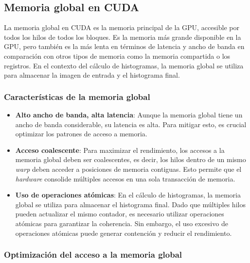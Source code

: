     \subsection{Memoria global en CUDA}

        La memoria global en CUDA es la memoria principal de la GPU, accesible por todos los hilos de todos los bloques. Es la memoria más grande disponible en la GPU, pero también es la más lenta en términos de latencia y ancho de banda en comparación con otros tipos de memoria como la memoria compartida o los registros. En el contexto del cálculo de histogramas, la memoria global se utiliza para almacenar la imagen de entrada y el histograma final.

        \subsubsection{Características de la memoria global}

            \begin{itemize}
               
                \item \textbf{Alto ancho de banda, alta latencia}: Aunque la memoria global tiene un ancho de banda considerable, su latencia es alta. Para mitigar esto, es crucial optimizar los patrones de acceso a memoria.
                
                \item \textbf{Acceso coalescente}: Para maximizar el rendimiento, los accesos a la memoria global deben ser coalescentes, es decir, los hilos dentro de un mismo \textit{warp} deben acceder a posiciones de memoria contiguas. Esto permite que el \textit{hardware} consolide múltiples accesos en una sola transacción de memoria.
               
                \item \textbf{Uso de operaciones atómicas}: En el cálculo de histogramas, la memoria global se utiliza para almacenar el histograma final. Dado que múltiples hilos pueden actualizar el mismo contador, es necesario utilizar operaciones atómicas para garantizar la coherencia. Sin embargo, el uso excesivo de operaciones atómicas puede generar contención y reducir el rendimiento.
                
            \end{itemize}
        
        \subsubsection{Optimización del acceso a la memoria global}
        
